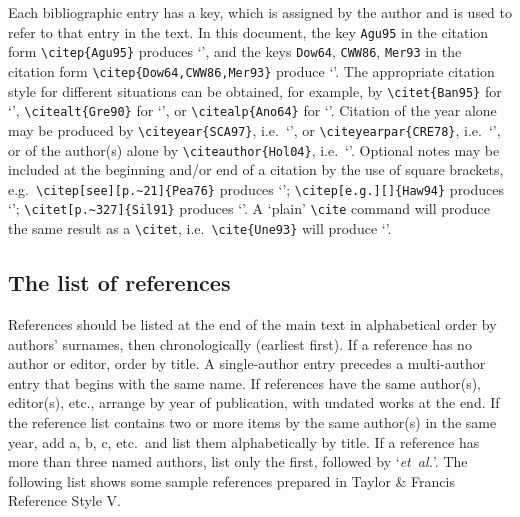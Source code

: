 \documentclass[]{interact}
\theoremstyle{plain}%
\theoremstyle{definition}
\theoremstyle{remark}
\begin{document}
Each bibliographic entry has a key, which is assigned by the author and is used to refer to that entry in the text. In this document, the key \verb"Agu95" in the citation form \verb"\citep{Agu95}" produces `\citep{Agu95}', and the keys \verb"Dow64", \verb"CWW86", \verb"Mer93" in the citation form \verb"\citep{Dow64,CWW86,Mer93}" produce `\citep{Dow64,CWW86,Mer93}'. The appropriate citation style for different situations can be obtained, for example, by \verb"\citet{Ban95}" for `\citet{Ban95}', \verb"\citealt{Gre90}" for `\citealt{Gre90}', or \verb"\citealp{Ano64}" for `\citealp{Ano64}'. Citation of the year alone may be produced by \verb"\citeyear{SCA97}", i.e.\ `\citeyear{SCA97}', or \verb"\citeyearpar{CRE78}", i.e.\ `\citeyearpar{CRE78}', or of the author(s) alone by \verb"\citeauthor{Hol04}", i.e.\ `\citeauthor{Hol04}'. Optional notes may be included at the beginning and/or end of a citation by the use of square brackets, e.g.\ \verb"\citep[see][p.~21]{Pea76}" produces `\citep[see][p.~21]{Pea76}'; \verb"\citep[e.g.][]{Haw94}" produces `\citep[e.g.][]{Haw94}'; \verb"\citet[p.~327]{Sil91}" produces `\citet[p.~327]{Sil91}'. A `plain' \verb"\cite" command will produce the same result as a \verb"\citet", i.e.\ \verb"\cite{Une93}" will produce `\cite{Une93}'.


\subsection{The list of references}

References should be listed at the end of the main text in alphabetical order by authors' surnames, then chronologically (earliest first).
If a reference has no author or editor, order by title. %
A single-author entry precedes a multi-author entry that begins with the same name.
If references have the same author(s), editor(s), etc., arrange by year of publication, with undated works at the end.
If the reference list contains two or more items by the same author(s) in the same year, add a, b, c, etc.\ and list them alphabetically by title.
If a reference has more than three named authors, list only the first, followed by `\textit{et~al.}'.
The following list shows some sample references prepared in Taylor \& Francis Reference Style V.
\end{document}
